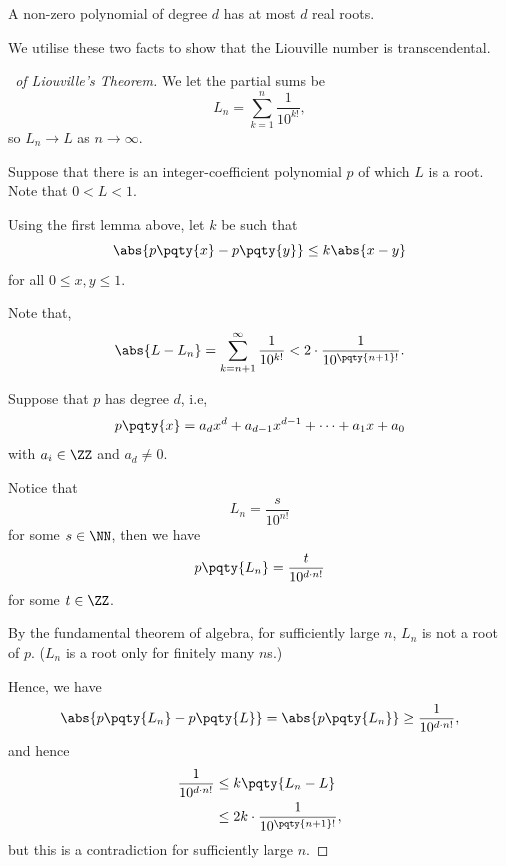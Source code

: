 \begin{lemma}
    A non-zero polynomial of degree \(d\) has at most \(d\) real roots.
\end{lemma}

We utilise these two facts to show that the Liouville number is transcendental.

\begin{proof}[\proofname\ of Liouville's Theorem]
    We let the partial sums be
    \[
        L_n = \sum_{k = 1}^{n} \frac{1}{10^{k!}},
    \]
    so \(L_n \to L\) as \(n \to \infty\).

    Suppose that there is an integer-coefficient polynomial \(p\) of which \(L\) is a root. Note that \(0 < L < 1\).

    Using the first lemma above, let \(k\) be such that
    \[
        \abs{p \pqty{x} - p \pqty{y}} \leq k \abs{x - y}
    \]
    for all \(0 \leq x, y \leq 1\).

    Note that,
    \[
        \abs{L - L_n} = \sum_{k = n + 1}^{\infty} \frac{1}{10^{k!}} < 2 \cdot \frac{1}{10^{\pqty{n + 1}!}}.
    \]

    Suppose that \(p\) has degree \(d\), i.e,
    \[
        p\pqty{x} = a_d x^d + a_{d - 1} x^{d - 1} + \cdots + a_1 x + a_0
    \]
    with \(a_i \in \ZZ\) and \(a_d \neq 0\).

    Notice that
    \[
        L_n = \frac{s}{10^{n!}}
    \]
    for some \(s \in \NN\), then we have
    \[
        p \pqty{L_n} = \frac{t}{10^{d \cdot n!}}
    \]
    for some \(t \in \ZZ\).

    By the fundamental theorem of algebra, for sufficiently large \(n\), \(L_n\) is not a root of \(p\). (\(L_n\) is a root only for finitely many \(n\)s.)

    Hence, we have
    \[
        \abs{p\pqty{L_n} - p\pqty{L}} = \abs{p\pqty{L_n}} \geq \frac{1}{10^{d \cdot n!}},
    \]
    and hence
    \begin{align*}
        \frac{1}{10^{d \cdot n!}} &\leq k \pqty{L_n - L} \\
        &\leq 2k \cdot \frac{1}{10^{\pqty{n + 1}!}},
    \end{align*}
    but this is a contradiction for sufficiently large \(n\).
\end{proof}

